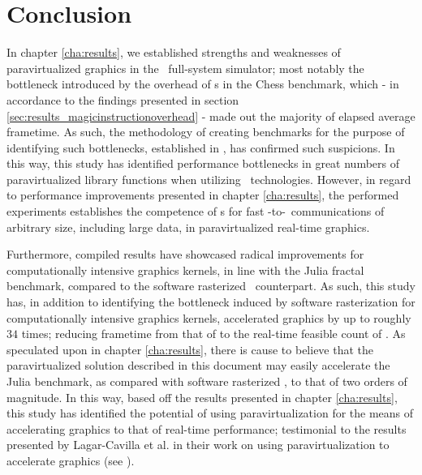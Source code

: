 
\chapter{Conclusion}
\label{cha:conclusion}
In chapter \ref{cha:results}, we established strengths and weaknesses of paravirtualized graphics in the \dvttermsimics\ full-system simulator; most notably the bottleneck introduced by the overhead of \dvttermmagicinstruction s in the Chess benchmark, which - in accordance to the findings presented in section \ref{sec:results_magicinstructionoverhead} - made out the majority of elapsed average frametime.
As such, the methodology of creating benchmarks for the purpose of identifying such bottlenecks, established in , has confirmed such suspicions.
In this way, this study has identified performance bottlenecks in great numbers of paravirtualized library functions when utilizing \dvttermmagicinstruction\ technologies.
However, in regard to performance improvements presented in chapter \ref{cha:results}, the performed experiments establishes the competence of \dvttermmagicinstruction s for fast \dvttermtarget -to-\dvttermhost\ communications of arbitrary size, including large data, in paravirtualized real-time graphics.

Furthermore, compiled results have showcased radical improvements for computationally intensive graphics kernels, in line with the Julia fractal benchmark, compared to the software rasterized \dvttermsimics\ counterpart.
As such, this study has, in addition to identifying the bottleneck induced by software rasterization for computationally intensive graphics kernels, accelerated graphics by up to roughly $34$ times; reducing frametime from that of  to the real-time feasible count of .
As speculated upon in chapter \ref{cha:results}, there is cause to believe that the paravirtualized solution described in this document may easily accelerate the Julia benchmark, as compared with software rasterized \dvttermsimics , to that of two orders of magnitude.
In this way, based off the results presented in chapter \ref{cha:results}, this study has identified the potential of using paravirtualization for the means of accelerating graphics to that of real-time performance; testimonial to the results presented by Lagar-Cavilla et al. in their work on using paravirtualization to accelerate graphics (see ).

